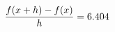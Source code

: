 \documentclass[preview]{standalone}
\begin{document}
\begin{align*}
\special{dvisvgm:raw <g id='unique000'>}\frac{f(x+h)-f(x)}{h} = 6.404\special{dvisvgm:raw </g>}
\end{align*}
\end{document}
